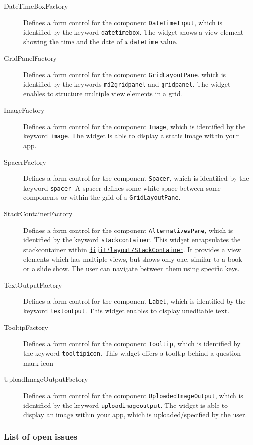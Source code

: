 \begin{description}
	\item[DateTimeBoxFactory] Defines a form control for the component \lstinline|DateTimeInput|, which is identified by the keyword \lstinline|datetimebox|. The widget shows a view element showing the time and the date of a \lstinline|datetime| value.
	\item[GridPanelFactory] Defines a form control for the component \lstinline|GridLayoutPane|, which is identified by the keywords \lstinline|md2gridpanel| and \lstinline|gridpanel|. The widget enables to structure multiple view elements in a grid.
	\item[ImageFactory] Defines a form control for the component \lstinline|Image|, which is identified by the keyword \lstinline|image|. The widget is able to display a static image within your app.
	\item[SpacerFactory] Defines a form control for the component \lstinline|Spacer|, which is identified by the keyword \lstinline|spacer|. A spacer defines some white space between some components or within the grid of a \lstinline|GridLayoutPane|.
	\item[StackContainerFactory] Defines a form control for the component \lstinline|AlternativesPane|, which is identified by the keyword \lstinline|stackcontainer|. This widget encapsulates the stackcontainer within \href{http://dojotoolkit.org/reference-guide/1.10/dijit/layout/StackContainer.html}{\lstinline|dijit/layout/StackContainer|}. It provides a view elements which has multiple views, but shows only one, similar to a book or a slide show. The user can navigate between them using specific keys. 
	\item[TextOutputFactory] Defines a form control for the component \lstinline|Label|, which is identified by the keyword \lstinline|textoutput|. This widget enables to display uneditable text.
	\item[TooltipFactory] Defines a form control for the component \lstinline|Tooltip|, which is identified by the keyword \lstinline|tooltipicon|. This widget offers a tooltip behind a question mark icon.
	\item[UploadImageOutputFactory] Defines a form control for the component \lstinline|UploadedImageOutput|, which is identified by the keyword \lstinline|uploadimageoutput|. The widget is able to display an image within your app, which is uploaded/specified by the user.
\end{description}

\subsubsection{List of open issues}

